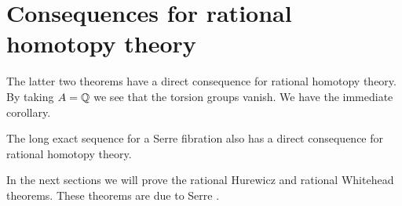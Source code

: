 \section{Consequences for rational homotopy theory}

The latter two theorems have a direct consequence for rational homotopy theory. By taking $A = \mathbb{Q}$ we see that the torsion groups vanish. We have the immediate corollary.


The long exact sequence for a Serre fibration also has a direct consequence for rational homotopy theory.

In the next sections we will prove the rational Hurewicz and rational Whitehead theorems. These theorems are due to Serre \cite{serre}.

